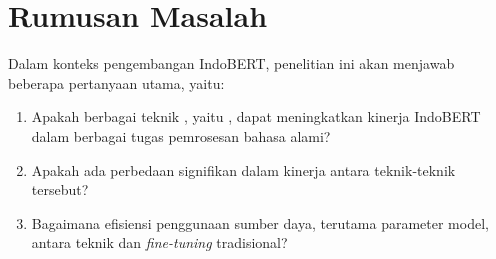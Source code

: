 \section{Rumusan Masalah}

Dalam konteks pengembangan IndoBERT, penelitian ini akan menjawab beberapa pertanyaan utama, yaitu:

\begin{enumerate}
    \item Apakah berbagai teknik \PETL, yaitu \methodPETL, dapat meningkatkan kinerja IndoBERT dalam berbagai tugas pemrosesan bahasa alami?
    \item Apakah ada perbedaan signifikan dalam kinerja antara teknik-teknik \PETL tersebut?
    \item Bagaimana efisiensi penggunaan sumber daya, terutama parameter model, antara teknik \PETL dan \textit{fine-tuning} tradisional?
\end{enumerate}